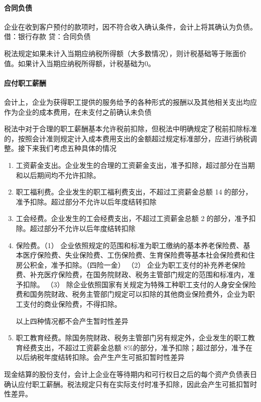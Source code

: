 \documentclass[UTF8,12pt]{ctexart}
\numberwithin{equation}{section} %
\numberwithin{figure}{section}
\numberwithin{table}{section}
\begin{document}
	\paragraph{合同负债}
	企业在收到客户预付的款项时，因不符合收入确认条件，会计上将其确认为负债。
	借：银行存款
	贷：合同负债
	
	税法规定如果未计入当期应纳税所得额（大多数情况），则计税基础等于账面价值。如果计入当期应纳税所得额，计税基础为0。
	
	\paragraph{应付职工薪酬}
	会计上，企业为获得职工提供的服务给予的各种形式的报酬以及其他相关支出均应作为企业的成本费用，在未支付之前确认未负债
	
	税法中对于合理的职工薪酬基本允许税前扣除，但税法中明确规定了税前扣除标准的，按照会计准则规定计入成本费用支出的金额超过规定标准部分，应进行纳税调整。接下来我们考虑五种具体的情况
	\begin{enumerate}
		\item 工资薪金支出。企业发生的合理的工资薪金支出，准予扣除，超过部分在当期和以后期间均不允许扣除。
		
		\item 职工福利费。企业发生的职工福利费支出，不超过工资薪金总额 14的部分，准予扣除。超过部分不允许以后年度结转扣除
		
		\item 工会经费。企业发生的工会经费支出，不超过工资薪金总额 2的部分，准予扣除。超过部分不允许以后年度结转扣除
		
		\item 保险费。（1）	企业依照规定的范围和标准为职工缴纳的基本养老保险费、基本医疗保险费、失业保险费、工伤保险费、生育保险费等基本社会保险费和住房公积金，准予扣除。（四险一金）
		（2）	企业为职工支付的补充养老保险费、补充医疗保险费，在国务院财政、税务主管部门规定的范围和标准内，准予扣除。
		（3）	除企业依照国家有关规定为特殊工种职工支付的人身安全保险费和国务院财政、税务主管部门规定可以扣除的其他商业保险费外，企业为职工支付的商业保险费，不得扣除。
		
		以上四种情况都不会产生暂时性差异
		
		\item 职工教育经费。除国务院财政、税务主管部门另有规定外，企业发生的职工教育经费支出，不超过工资薪金总额 8\%的部分，准予扣除；超过部分，准予在以后纳税年度结转扣除。会产生产生可抵扣暂时性差异
	\end{enumerate}
	
	现金结算的股份支付，会计上企业在等待期内和可行权日之后的每个资产负债表日确认应付职工薪酬。税法规定只有在实际支付时准予扣除，因此会产生可抵扣暂时性差异。
	
\end{document}
